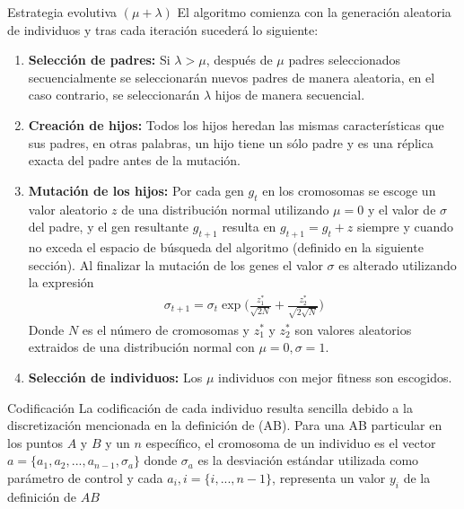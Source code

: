 \documentclass[10pt, letterpaper]{article}
\theoremstyle{definition}
\begin{document}
\begin{section}{Estrategia evolutiva $(\mu + \lambda)$}
    El algoritmo comienza con la generación aleatoria de individuos y tras cada
    iteración sucederá lo siguiente:
    \begin{enumerate}
        \item \textbf{Selección de padres:} Si $\lambda > \mu$, después de $\mu$
              padres seleccionados secuencialmente se seleccionarán nuevos padres
              de manera aleatoria, en el caso contrario, se seleccionarán $\lambda$
              hijos de manera secuencial.
        \item \textbf{Creación de hijos:} Todos los hijos heredan las mismas
              características que sus padres, en otras palabras, un hijo tiene
              un sólo padre y es una réplica exacta del padre antes de la mutación.
        \item \textbf{Mutación de los hijos:} Por cada gen $g_t$ en los cromosomas se
              escoge un valor aleatorio $z$ de una distribución normal utilizando
              $\mu=0$ y el valor de $\sigma$ del padre, y el gen resultante $g_{t+1}$
              resulta en $g_{t+1} = g_t + z$ siempre y cuando no exceda el espacio
              de búsqueda del algoritmo (definido en la siguiente sección). Al
              finalizar la mutación de los genes el valor $\sigma$ es alterado
              utilizando la expresión
              \begin{equation} \begin{gathered}
                \sigma_{t+1} = \sigma_t\exp\Big( \frac{z_1^*}{\sqrt{2N}} + \frac{z_2^*}{\sqrt{2\sqrt{N}}}\Big)
              \end{gathered} \end{equation}
              Donde $N$ es el número de cromosomas y $z_1^*$ y $z_2^*$ son valores
              aleatorios extraidos de una distribución normal con $\mu=0, \sigma=1$.
        \item \textbf{Selección de individuos:} Los $\mu$ individuos con mejor
              fitness son escogidos.
    \end{enumerate}
    \begin{subsection}{Codificación}
        La codificación de cada individuo resulta sencilla debido a la
        discretización mencionada en la definición de (AB). Para una AB particular
        en los puntos $A$ y $B$ y un $n$ específico, el cromosoma de un individuo
        es el vector $a = \{a_1, a_2, ..., a_{n-1}, \sigma_a\}$ donde $\sigma_a$
        es la desviación estándar utilizada como parámetro de control y cada
        $a_i, i=\{i,...,n-1\}$, representa un valor $y_i$ de la definición de $AB$

\end{subsection}
\end{section}
\end{document}
